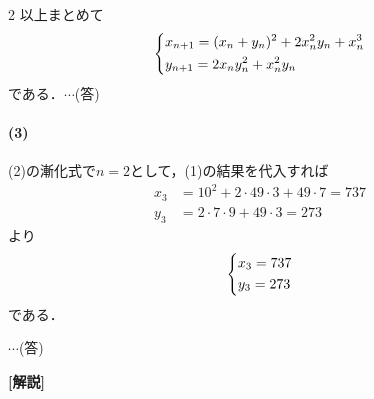 \documentclass[../../main.tex]{subfiles}
\begin{document}
\begin{multicols}{2}
  以上まとめて
  \begin{align}
    \begin{dcases}
      x_{n+1} = (x_n+y_n)^2 + 2x_n^2y_n + x_n^3 \\
      y_{n+1} = 2x_n y_n^2 + x_n^2 y_n
    \end{dcases}
  \end{align}
  である．$\cdots$(答)

  \paragraph{(3)}
  (2)の漸化式で$n=2$として，(1)の結果を代入すれば
  \begin{align}
    x_3 & = 10^2 + 2 \cdot 49 \cdot 3 + 49 \cdot 7 = 737 \\
    y_3 & = 2 \cdot 7 \cdot 9 + 49 \cdot 3 = 273
  \end{align}
  より
  \begin{align}
    \begin{dcases}
      x_3 = 737 \\
      y_3 = 273
    \end{dcases}
  \end{align}
  である．

  $\cdots$(答)

  {\bf [解説]}

  \newpage
\end{multicols}
\end{document}
